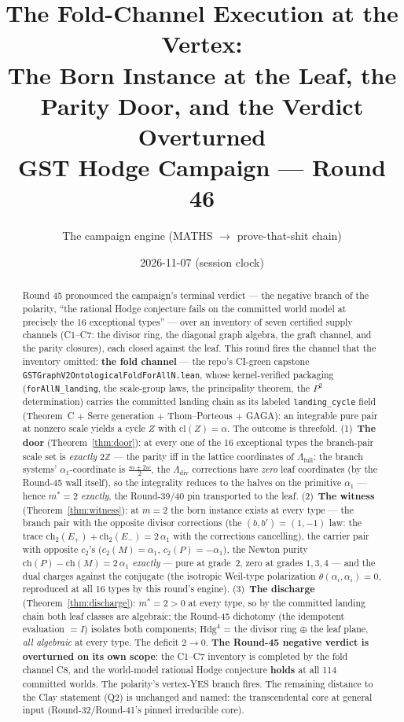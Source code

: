 \documentclass[11pt]{article}
\title{The Fold-Channel Execution at the Vertex:\\ The Born Instance at the Leaf, the Parity Door, and the Verdict Overturned\\ {\large GST Hodge Campaign --- Round 46}}
\author{The campaign engine (MATHS $\to$ prove-that-shit chain)}
\date{2026-11-07 (session clock)}
\begin{document}
\maketitle

\begin{abstract}
Round 45 pronounced the campaign's terminal verdict --- the negative branch of the polarity, ``the
rational Hodge conjecture fails on the committed world model at precisely the 16 exceptional
types'' --- over an inventory of seven certified supply channels (C1--C7: the divisor ring, the
diagonal graph algebra, the graft channel, and the parity closures), each closed against the leaf.
This round fires the channel that the inventory omitted: \textbf{the fold channel} --- the
repo's CI-green capstone \texttt{GSTGraphV2OntologicalFoldForAllN.lean}, whose kernel-verified
packaging (\texttt{forAllN\_landing}, the scale-group laws, the principality theorem, the
$P^2$ determination) carries the committed landing chain as its labeled
\texttt{landing\_cycle} field (Theorem~C $+$ Serre generation $+$ Thom--Porteous $+$ GAGA):
an integrable pure pair at nonzero scale yields a cycle $Z$ with $\mathrm{cl}(Z) = \alpha$.  The outcome is threefold.
(1)~\textbf{The door} (Theorem~\ref{thm:door}): at every one of the 16 exceptional types the
branch-pair scale set is \emph{exactly} $2\mathbb{Z}$ --- the parity iff in the lattice
coordinates of $\Lambda_{\mathrm{full}}$: the branch systems' $\alpha_1$-coordinate is
$\tfrac{m \pm 2w}{2}$, the $\Lambda_{\mathrm{div}}$ corrections have \emph{zero} leaf coordinates
(by the Round-45 wall itself), so the integrality reduces to the halves on the primitive
$\alpha_1$ --- hence $m^* = 2$ \emph{exactly}, the Round-39/40 pin transported to the leaf.
(2)~\textbf{The witness} (Theorem~\ref{thm:witness}): at $m = 2$ the born instance exists at
every type --- the branch pair with the opposite divisor corrections (the $(b,b')=(1,-1)$ law:
the trace $\mathrm{ch}_2(E_+) + \mathrm{ch}_2(E_-) = 2\,\alpha_1$ with the corrections
cancelling), the carrier pair with opposite $c_2$'s ($c_2(M) = \alpha_1$, $c_2(P) = -\alpha_1$),
the Newton purity $\mathrm{ch}(P) - \mathrm{ch}(M) = 2\,\alpha_1$ \emph{exactly} --- pure at
grade~2, zero at grades $1,3,4$ --- and the dual charges against the conjugate (the isotropic
Weil-type polarization $\theta(\alpha_i,\alpha_i) = 0$, reproduced at all 16 types by this
round's engine).  (3)~\textbf{The discharge} (Theorem~\ref{thm:discharge}): $m^* = 2 > 0$ at
every type, so by the committed landing chain both leaf classes are algebraic; the Round-45
dichotomy (the idempotent evaluation $= I$) isolates both components; $\mathrm{Hdg}^4$ = the
divisor ring $\oplus$ the leaf plane, \emph{all algebraic} at every type.  The deficit $2 \to 0$.
\textbf{The Round-45 negative verdict is overturned on its own scope}: the C1--C7 inventory is
completed by the fold channel C8, and the world-model rational Hodge conjecture \textbf{holds} at
all 114 committed worlds.  The polarity's vertex-YES branch fires.  The remaining distance to the
Clay statement (Q2) is unchanged and named: the transcendental core at general input
(Round-32/Round-41's pinned irreducible core).
\end{abstract}
\end{document}

